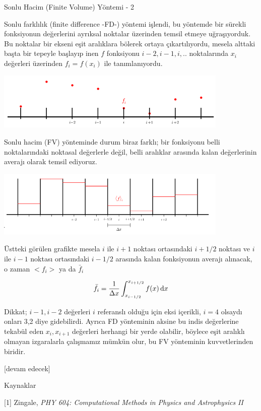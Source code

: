 \documentclass[12pt,fleqn]{article}\usepackage{../../common}
\begin{document}
Sonlu Hacim (Finite Volume) Yöntemi - 2

Sonlu farklılık (finite difference -FD-) yöntemi işlendi, bu yöntemde bir
sürekli fonksiyonun değerlerini ayrıksal noktalar üzerinden temsil etmeye
uğraşıyorduk.  Bu noktalar bir ekseni eşit aralıklara bölerek ortaya
çıkartılıyordu, mesela alttaki başta bir tepeyle başlayıp inen $f$ fonksiyonu
$i-2,i-1,i,..$ noktalarında $x_i$ değerleri üzerinden $f_i = f(x_i)$ ile
tanımlanıyordu.

\includegraphics[width=30em]{13-22-29.png}

Sonlu hacim (FV) yönteminde durum biraz farklı; bir fonksiyonu belli
noktalarındaki noktasal değerlerle değil, belli aralıklar arasında kalan
değerlerinin averajı olarak temsil ediyoruz.

\includegraphics[width=30em]{13-22-34.png}

Üstteki görülen grafikte mesela $i$ ile $i+1$ noktası ortasındaki $i+1/2$
noktası ve $i$ ile $i-1$ noktası ortasındaki $i-1/2$ arasında kalan fonksiyonun
averajı alınacak, o zaman $<f_i>$ ya da $\bar{f}_i$

$$
\bar{f}_i = \frac{1}{\Delta x} \int _{x_{i-1/2}}^{x_{i+1/2}} f(x) \,\mathrm{d} x
$$

Dikkat; $i-1,i-2$ değerleri $i$ referanslı olduğu için eksi içerikli, $i=4$
olsaydı onları 3,2 diye gidebilirdi. Ayrıca FD yönteminin aksine bu indis
değerlerine tekabül eden $x_i,x_{i+1}$ değerleri herhangi bir yerde olabilir,
böylece eşit aralıklı olmayan izgaralarla çalışmamız mümkün olur, bu FV
yönteminin kuvvetlerinden biridir.




[devam edecek]
  
Kaynaklar

[1] Zingale, {\em PHY 604: Computational Methods in Physics and Astrophysics II}
\end{document}
